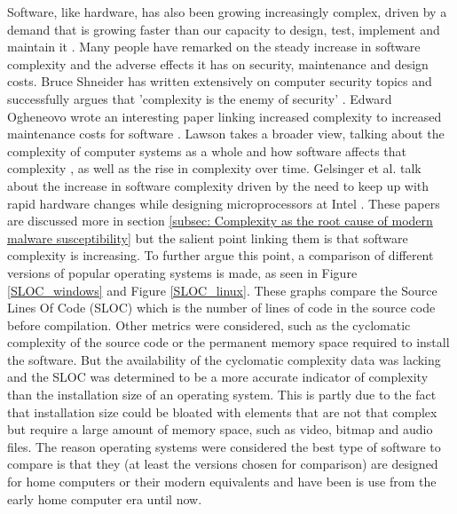 Software, like hardware, has also been growing increasingly complex, driven by a demand that is growing faster than our capacity to design, test, implement and maintain it
\cite{RN85}. Many people have remarked on the steady increase in software complexity and the adverse effects it has on security, maintenance and design costs. Bruce Shneider has written extensively on computer security topics and successfully argues that 'complexity is the enemy of security' 
\cite{RN11} \cite{RN3}. Edward Ogheneovo wrote an interesting paper linking increased complexity to increased maintenance costs for software 
\cite{RN81}. Lawson takes a broader view, talking about the complexity of computer systems as a whole and how software affects that complexity 
\cite{RN55}, as well as the rise in complexity over time. Gelsinger et al. talk about the increase in software complexity driven by the need to keep up with rapid hardware changes while designing microprocessors at Intel 
\cite{RN18}. These papers are discussed more in section \ref{subsec: Complexity as the root cause of modern malware susceptibility} but the salient point linking them is that software complexity is increasing. To further argue this point, a comparison of different versions of popular operating systems is made, as seen in Figure \ref{SLOC_windows} and Figure \ref{SLOC_linux}. These graphs compare the Source Lines Of Code (SLOC) which is the number of lines of code in the source code before compilation. Other metrics were considered, such as the cyclomatic complexity of the source code or the permanent memory space required to install the software. But the availability of the cyclomatic complexity data was lacking and the SLOC was determined to be a more accurate indicator of complexity than the installation size of an operating system. This is partly due to the fact that installation size could be bloated with elements that are not that complex but require a large amount of memory space, such as video, bitmap and audio files. The reason operating systems were considered the best type of software to compare is that they (at least the versions chosen for comparison) are designed for home computers or their modern equivalents and have been is use from the early home computer era until now. 

